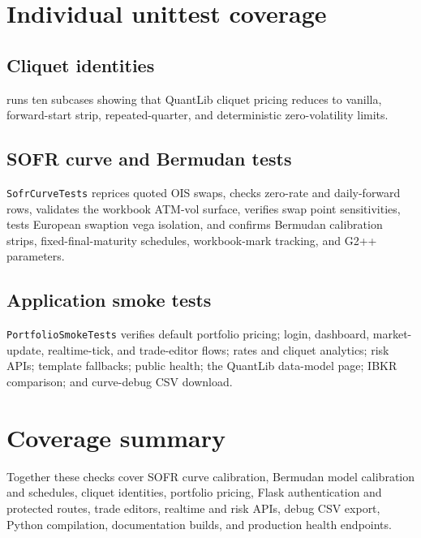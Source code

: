 \documentclass[conference]{IEEEtran}
\begin{document}
\section{Individual unittest coverage}
\subsection{Cliquet identities}
 runs ten subcases showing that QuantLib cliquet pricing reduces to vanilla, forward-start strip, repeated-quarter, and deterministic zero-volatility limits.

\subsection{SOFR curve and Bermudan tests}
\texttt{SofrCurveTests} reprices quoted OIS swaps, checks zero-rate and daily-forward rows, validates the workbook ATM-vol surface, verifies swap point sensitivities, tests European swaption vega isolation, and confirms Bermudan calibration strips, fixed-final-maturity schedules, workbook-mark tracking, and G2++ parameters.

\subsection{Application smoke tests}
\texttt{PortfolioSmokeTests} verifies default portfolio pricing; login, dashboard, market-update, realtime-tick, and trade-editor flows; rates and cliquet analytics; risk APIs; template fallbacks; public health; the QuantLib data-model page; IBKR comparison; and curve-debug CSV download.

\section{Coverage summary}
Together these checks cover SOFR curve calibration, Bermudan model calibration and schedules, cliquet identities, portfolio pricing, Flask authentication and protected routes, trade editors, realtime and risk APIs, debug CSV export, Python compilation, documentation builds, and production health endpoints.
\end{document}
